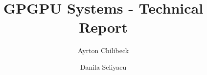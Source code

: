 



\title{GPGPU Systems - Technical Report}
\author[1]{Ayrton Chilibeck}
\author[1]{Danila Seliyaeu}



\maketitle

\vspace{2ex}












